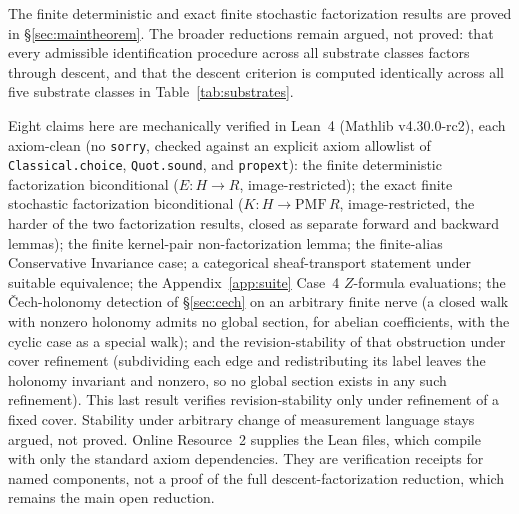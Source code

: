 \documentclass[11pt]{article}
\begin{document}
The finite deterministic and exact finite stochastic factorization
results are proved in \S\ref{sec:maintheorem}. The broader reductions remain argued, not
proved: that every admissible identification procedure across all substrate
classes factors through descent, and that the descent criterion is computed
identically across all five substrate classes in Table~\ref{tab:substrates}.

Eight claims here are mechanically verified in Lean~4 (Mathlib v4.30.0-rc2),
each axiom-clean (no \texttt{sorry}, checked against an explicit axiom allowlist
of \texttt{Classical.choice}, \texttt{Quot.sound}, and \texttt{propext}): the
finite deterministic factorization biconditional ($E : H \to R$,
image-restricted); the exact finite stochastic factorization biconditional
($K : H \to \mathrm{PMF}\,R$, image-restricted, the harder of the two
factorization results, closed as separate forward and backward lemmas); the
finite kernel-pair non-factorization lemma; the finite-alias Conservative
Invariance case; a categorical sheaf-transport statement under suitable
equivalence; the Appendix~\ref{app:suite} Case~4 $Z$-formula evaluations; the
\v{C}ech-holonomy detection of \S\ref{sec:cech} on an arbitrary finite nerve (a
closed walk with nonzero holonomy admits no global section, for abelian
coefficients, with the cyclic case as a special walk); and the
revision-stability of that obstruction under cover refinement (subdividing each
edge and redistributing its label leaves the holonomy invariant and nonzero, so
no global section exists in any such refinement). This last result verifies
revision-stability only under refinement of a fixed cover. Stability under
arbitrary change of measurement language stays argued, not proved. Online
Resource~2 supplies the Lean files, which compile with only the standard axiom
dependencies. They are verification receipts for named components, not a proof of
the full descent-factorization reduction, which remains the main open reduction.
\end{document}
